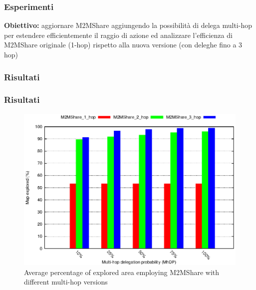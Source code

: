 \documentclass{beamer}
\begin{document}
\begin{frame}
\frametitle{Esperimenti}
\label{descrizione multi hop}
\textbf{Obiettivo:} aggiornare M2MShare aggiungendo la possibilità di delega multi-hop per estendere efficientemente il raggio di azione ed analizzare l’efficienza di M2MShare originale (1-hop) rispetto alla nuova versione  (con deleghe fino a 3 hop)
\end{frame}

\begin{frame}
\frametitle{Risultati}
\label{mappa multi hop}
\vspace{-40pt}
\begin{center}
\begin{figure}

\end{figure}

\end{center}
  
\end{frame}


\begin{frame}
\frametitle{Risultati}
\begin{center}
\begin{figure}[ht]
\includegraphics[scale=0.7]{mapCovered_MultiHop.eps}
\caption{Average percentage of explored area employing M2MShare with different multi-hop versions}
\end{figure}
\end{center}
\end{frame}
\end{document}

